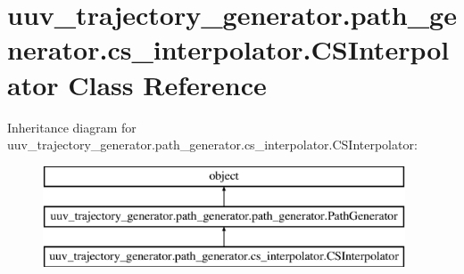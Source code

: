 \hypertarget{classuuv__trajectory__generator_1_1path__generator_1_1cs__interpolator_1_1CSInterpolator}{}\section{uuv\+\_\+trajectory\+\_\+generator.\+path\+\_\+generator.\+cs\+\_\+interpolator.\+C\+S\+Interpolator Class Reference}
\label{classuuv__trajectory__generator_1_1path__generator_1_1cs__interpolator_1_1CSInterpolator}
Inheritance diagram for uuv\+\_\+trajectory\+\_\+generator.\+path\+\_\+generator.\+cs\+\_\+interpolator.\+C\+S\+Interpolator\+:\begin{figure}[H]
\begin{center}
\leavevmode
\includegraphics[height=3.000000cm]{classuuv__trajectory__generator_1_1path__generator_1_1cs__interpolator_1_1CSInterpolator}
\end{center}
\end{figure}
